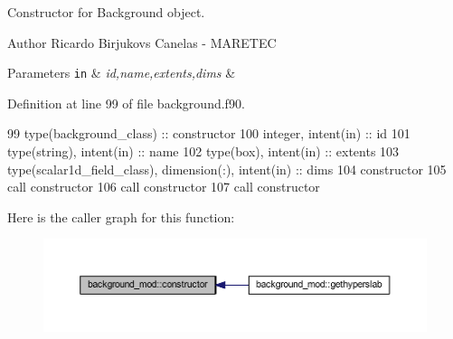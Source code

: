 Constructor for Background object. 

\begin{DoxyAuthor}{Author}
Ricardo Birjukovs Canelas -\/ M\+A\+R\+E\+T\+EC 
\end{DoxyAuthor}

\begin{DoxyParams}[1]{Parameters}
\mbox{\tt in}  & {\em id,name,extents,dims} & \\
\hline
\end{DoxyParams}


Definition at line 99 of file background.\+f90.


\begin{DoxyCode}
99     \textcolor{keywordtype}{type}(background\_class) :: constructor
100     \textcolor{keywordtype}{integer}, \textcolor{keywordtype}{intent(in)} :: id
101     \textcolor{keywordtype}{type}(string), \textcolor{keywordtype}{intent(in)} :: name
102     \textcolor{keywordtype}{type}(box), \textcolor{keywordtype}{intent(in)} :: extents
103     \textcolor{keywordtype}{type}(scalar1d\_field\_class), \textcolor{keywordtype}{dimension(:)}, \textcolor{keywordtype}{intent(in)} :: dims
104     constructor%
105     \textcolor{keyword}{call }constructor%
106     \textcolor{keyword}{call }constructor%
107     \textcolor{keyword}{call }constructor%
\end{DoxyCode}
Here is the caller graph for this function\+:
\nopagebreak
\begin{figure}[H]
\begin{center}
\leavevmode
\includegraphics[width=350pt]{namespacebackground__mod_ad0096fb6a5a11854fd70a7ce58dc3000_icgraph}
\end{center}
\end{figure}
\mbox{\label{namespacebackground__mod_a64c3966a113bc0f3b603c591bc345ca1}} 
